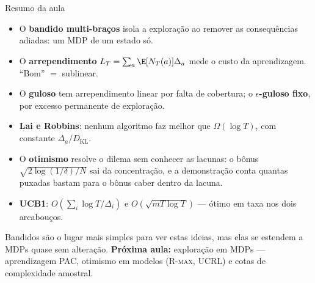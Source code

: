 \documentclass[aspectratio=169, 10pt]{beamer}
\newcommand{\Nc}{N}                         %
\newcommand{\gap}{\Delta}
\newcommand{\KL}{D_{\mathrm{KL}}}
\newcommand{\Reg}{L}
\begin{document}
\begin{frame}{Resumo da aula}
  \begin{itemize}
    \item O \textbf{bandido multi-braços} isola a exploração ao remover as
          consequências adiadas: um MDP de um estado só.
    \item O \textbf{arrependimento} $\Reg_T = \sum_a \E[\Nc_T(a)]\gap_a$
          mede o custo da aprendizagem. ``Bom'' $=$ sublinear.
    \item O \textbf{guloso} tem arrependimento linear por falta de
          cobertura; o \textbf{$\epsilon$-guloso fixo}, por excesso
          permanente de exploração.
    \item \textbf{Lai e Robbins}: nenhum algoritmo faz melhor que
          $\Omega(\log T)$, com constante $\gap_a/\KL$.
    \item O \textbf{otimismo} resolve o dilema sem conhecer as lacunas: o
          bônus $\sqrt{2\log(1/\delta)/\Nc}$ sai da concentração, e a
          demonstração conta quantas puxadas bastam para o bônus caber
          dentro da lacuna.
    \item \textbf{UCB1}: $O(\sum_i \log T/\gap_i)$ e $O(\sqrt{mT\log T})$
          --- ótimo em taxa nos dois arcabouços.
  \end{itemize}

  \begin{ideiabox}
    Bandidos são o lugar mais simples para ver estas ideias, mas elas se
    estendem a MDPs quase sem alteração. \textbf{Próxima aula:}
    exploração em MDPs --- aprendizagem PAC, otimismo em modelos
    (\textsc{R-max}, UCRL) e cotas de complexidade amostral.
  \end{ideiabox}
\end{frame}
\end{document}

